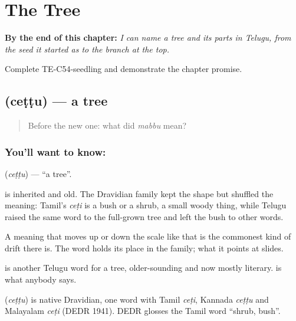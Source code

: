 
\chapter{The Tree}
\label{ch:te-tree}

\begin{chapteropening}
\textbf{By the end of this chapter:} \emph{I can name a tree and its parts in Telugu, from the seed it started as to the branch at the top.}

Complete TE-C54-seedling and demonstrate the chapter promise.
\end{chapteropening}

\section[\texorpdfstring{\te{చెట్టు} (ceṭṭu)}{చెట్టు (ceṭṭu)}]{ (ceṭṭu) — a tree}

\label{lesson:TE-C54-tree}



\begin{quote}
Before the new one: what did \emph{mabbu} mean?
\end{quote}

\subsection*{You'll want to know: }
\textbf{} (\emph{ceṭṭu}) — \textquotedblleft{}a tree\textquotedblright{}.

 is inherited and old. The Dravidian family kept the shape but shuffled the meaning: Tamil's \emph{ceṭi} is a bush or a shrub, a small woody thing, while Telugu raised the same word to the full-grown tree and left the bush to other words.

A meaning that moves up or down the scale like that is the commonest kind of drift there is. The word holds its place in the family; what it points at slides.

 is another Telugu word for a tree, older-sounding and now mostly literary.  is what anybody says.

\begin{cousinweb}
\textbf{} (\emph{ceṭṭu}) is native Dravidian, one word with Tamil \emph{ceṭi}, Kannada \emph{ceṭṭu} and Malayalam \emph{ceṭi} (DEDR 1941). DEDR glosses the Tamil word \textquotedblleft{}shrub, bush\textquotedblright{}.
\end{cousinweb}

